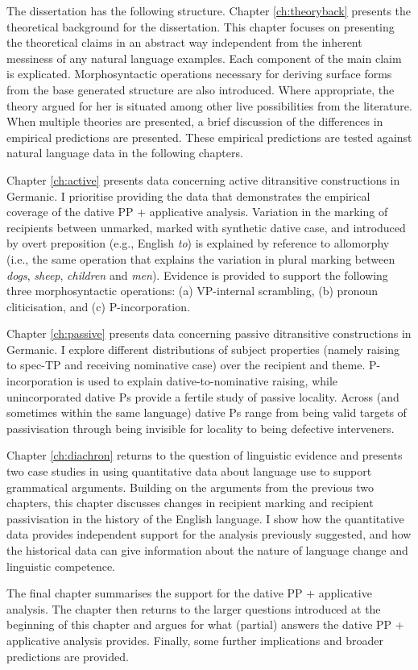 The dissertation has the following structure. Chapter \ref{ch:theoryback} presents the theoretical background for the dissertation. This chapter focuses on presenting the theoretical claims in an abstract way independent from the inherent messiness of any natural language examples. Each component of the main claim is explicated. Morphosyntactic operations necessary for deriving surface forms from the base generated structure are also introduced. Where appropriate, the theory argued for her is situated among other live possibilities from the literature. When multiple theories are presented, a brief discussion of the differences in empirical predictions are presented. These empirical predictions are tested against natural language data in the following chapters.

Chapter \ref{ch:active} presents data concerning active ditransitive constructions in Germanic. I prioritise providing the data that demonstrates the empirical coverage of the dative PP + applicative analysis. Variation in the marking of recipients between unmarked, marked with synthetic dative case, and introduced by overt preposition (e.g., English \textit{to}) is explained by reference to allomorphy (i.e., the same operation that explains the variation in plural marking between \textit{dogs}, \textit{sheep}, \textit{children} and \textit{men}). Evidence is provided to support the following three morphosyntactic operations: (a) VP-internal scrambling, (b) pronoun cliticisation, and (c) P-incorporation. 

Chapter \ref{ch:passive} presents data concerning passive ditransitive constructions in Germanic. I explore different distributions of subject properties (namely raising to spec-TP and receiving nominative case) over the recipient and theme. P-incorporation is used to explain dative-to-nominative raising, while unincorporated dative Ps provide a fertile study of passive locality. Across (and sometimes within the same language) dative Ps range from being valid targets of passivisation through being invisible for locality to being defective interveners.

Chapter \ref{ch:diachron} returns to the question of linguistic evidence and presents two case studies in using quantitative data about language use to support grammatical arguments. Building on the arguments from the previous two chapters, this chapter discusses changes in recipient marking and recipient passivisation in the history of the English language. I show how the quantitative data provides independent support for the analysis previously suggested, and how the historical data can give information about the nature of language change and linguistic competence.

The final chapter summarises the support for the dative PP + applicative analysis. The chapter then returns to the larger questions introduced at the beginning of this chapter and argues for what (partial) answers the dative PP + applicative analysis provides. Finally, some further implications and broader predictions are provided. 
%
